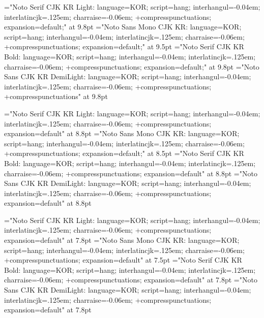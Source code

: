 


%
\sethangulfont\tenmj="Noto Serif CJK KR Light:%
  language=KOR;%
  script=hang;%
  interhangul=-0.04em;%
  interlatincjk=.125em;%
  charraise=-0.06em;%
  +compresspunctuations;%
  expansion=default;" at 9.8pt
\sethangulfont\tentz="Noto Sans Mono CJK KR:%
  language=KOR;%
  script=hang;%
  interhangul=-0.04em;%
  interlatincjk=.125em;%
  charraise=-0.06em;%
  +compresspunctuations;%
  expansion=default;" at 9.5pt
\sethangulfont\tenbd="Noto Serif CJK KR Bold:%
  language=KOR;%
  script=hang;%
  interhangul=-0.04em;%
  interlatincjk=.125em;%
  charraise=-0.06em;%
  +compresspunctuations;%
  expansion=default;" at 9.8pt
\sethangulfont\tensn="Noto Sans CJK KR DemiLight:%
  language=KOR;%
  script=hang;%
  interhangul=-0.04em;%
  interlatincjk=.125em;%
  charraise=-0.06em;%
  +compresspunctuations;%
  +compresspunctuations" at 9.8pt

\sethangulfont\ninemj="Noto Serif CJK KR Light:%
  language=KOR;%
  script=hang;%
  interhangul=-0.04em;%
  interlatincjk=.125em;%
  charraise=-0.06em;%
  +compresspunctuations;%
  expansion=default" at 8.8pt
\sethangulfont\ninetz="Noto Sans Mono CJK KR:
  language=KOR;%
  script=hang;%
  interhangul=-0.04em;%
  interlatincjk=.125em;%
  charraise=-0.06em;%
  +compresspunctuations;%
  expansion=default;" at 8.5pt
\sethangulfont\ninebd="Noto Serif CJK KR Bold:%
  language=KOR;%
  script=hang;%
  interhangul=-0.04em;%
  interlatincjk=.125em;%
  charraise=-0.06em;%
  +compresspunctuations;%
  expansion=default" at 8.8pt
\sethangulfont\ninesn="Noto Sans CJK KR DemiLight:%
  language=KOR;%
  script=hang;%
  interhangul=-0.04em;%
  interlatincjk=.125em;%
  charraise=-0.06em;%
  +compresspunctuations;%
  expansion=default" at 8.8pt

\sethangulfont\eightmj="Noto Serif CJK KR Light:%
  language=KOR;%
  script=hang;%
  interhangul=-0.04em;%
  interlatincjk=.125em;%
  charraise=-0.06em;%
  +compresspunctuations;%
  expansion=default" at 7.8pt
\sethangulfont\eighttz="Noto Sans Mono CJK KR:%
  language=KOR;%
  script=hang;%
  interhangul=-0.04em;%
  interlatincjk=.125em;%
  charraise=-0.06em;%
  +compresspunctuations;%
  expansion=default" at 7.5pt
\sethangulfont\eightbd="Noto Serif CJK KR Bold:%
  language=KOR;%
  script=hang;%
  interhangul=-0.04em;%
  interlatincjk=.125em;%
  charraise=-0.06em;%
  +compresspunctuations;%
  expansion=default" at 7.8pt
\sethangulfont\eightsn="Noto Sans CJK KR DemiLight:%
  language=KOR;%
  script=hang;%
  interhangul=-0.04em;%
  interlatincjk=.125em;%
  charraise=-0.06em;%
  +compresspunctuations;%
  expansion=default" at 7.8pt

